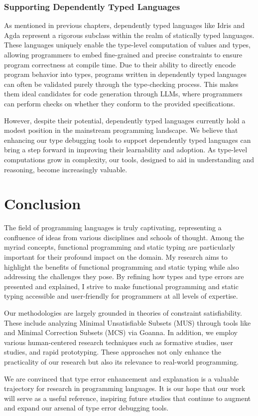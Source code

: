 \subsubsection{Supporting Dependently Typed Languages}

As mentioned in previous chapters, dependently typed languages like Idris and Agda represent a rigorous subclass within the realm of statically typed languages. These languages uniquely enable the type-level computation of values and types, allowing programmers to embed fine-grained and precise constraints to ensure program correctness at compile time. Due to their ability to directly encode program behavior into types, programs written in dependently typed languages can often be validated purely through the type-checking process. This makes them ideal candidates for code generation through LLMs, where programmers can perform checks on whether they conform to the provided specifications. 

However, despite their potential, dependently typed languages currently hold a modest position in the mainstream programming landscape. We believe that enhancing our type debugging tools to support dependently typed languages can bring a step forward in improving their learnability and adoption. As type-level computations grow in complexity, our tools, designed to aid in understanding and reasoning, become increasingly valuable. 


\section{Conclusion}


The field of programming languages is truly captivating, representing a confluence of ideas from various disciplines and schools of thought. Among the myriad concepts, functional programming and static typing are particularly important for their profound impact on the domain. My research aims to highlight the benefits of functional programming and static typing while also addressing the challenges they pose. By refining how types and type errors are presented and explained, I strive to make functional programming and static typing accessible and user-friendly for programmers at all levels of expertise.

Our methodologies are largely grounded in theories of constraint satisfiability. These include analyzing Minimal Unsatisfiable Subsets (MUS) through tools like \chameleon{} and Minimal Correction Subsets (MCS) via Goanna. In addition, we employ various human-centered research techniques such as formative studies, user studies, and rapid prototyping. These approaches not only enhance the practicality of our research but also its relevance to real-world programming.

We are convinced that type error enhancement and explanation is a valuable trajectory for research in programming languages. It is our hope that our work will serve as a useful reference, inspiring future studies that continue to augment and expand our arsenal of type error debugging tools.


